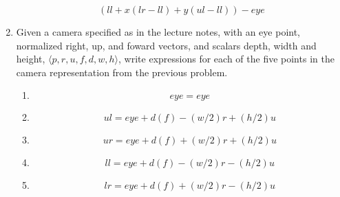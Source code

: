 \documentclass{article}
\begin{document}
\begin{enumerate}
\[ (ll + x(lr-ll) + y(ul-ll)) - eye\]

\item Given a camera specified as in the lecture notes, with an eye
  point, normalized right, up, and foward vectors, and scalars depth,
  width and height, $\langle p, r, u, f, d, w, h\rangle$, write
  expressions for each of the five points in the camera representation
  from the previous problem.
  \begin{enumerate}
  \item \[eye = eye\]

    \item \[ul =  eye + d(f) - (w/2) r + (h/2) u\]

    \item \[ur = eye + d(f) + (w/2) r + (h/2) u\]

    \item \[ll = eye + d(f) - (w/2) r - (h/2) u\]

    \item \[lr = eye + d(f) + (w/2) r - (h/2) u\]

  \end{enumerate}
  
\end{enumerate}
\end{document}
